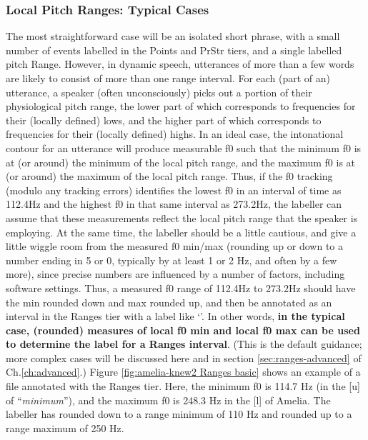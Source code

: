 \documentclass[11pt, twoside]{memoir}
\def\textlabel#1{{\relsize{-.5}\fontspec[Mapping=tex-text]{Roboto Mono}{#1}}}
\def\langtext#1{\textit{#1}}
\begin{document}
\subsubsection{Local Pitch Ranges: Typical Cases}\label{sec:local-pitch-ranges-typical-cases}
The most straightforward case will be an isolated short phrase, with a small number of events labelled in the Points and PrStr tiers, and a single labelled pitch Range. However, in dynamic speech, utterances of more than a few words are likely to consist of more than one range interval.
For each (part of an) utterance, a speaker (often unconsciously) picks out a portion of their physiological pitch range, the lower part of which corresponds to frequencies for their (locally defined) lows, and the higher part of which corresponds to frequencies for their (locally defined) highs. In an ideal case, the intonational contour for an utterance will produce measurable f0 such that the minimum f0 is at (or around) the minimum of the local pitch range, and the maximum f0 is at (or around) the maximum of the local pitch range. Thus, if the f0 tracking (modulo any tracking errors) identifies the lowest f0 in an interval of time as 112.4Hz and the highest f0 in that same interval as 273.2Hz, the labeller can assume that these measurements reflect the local pitch range that the speaker is employing.
At the same time, the labeller should be a little cautious, and give a little wiggle room from the measured f0 min\slash max (rounding up or down to a number ending in 5 or 0, typically by at least 1 or 2 Hz, and often by a few more), since precise numbers are influenced by a number of factors, including software settings. Thus, a measured f0 range of 112.4Hz to 273.2Hz should have the min rounded down and max rounded up, and then be annotated as an interval in the Ranges tier with a label like ‘\textlabel{110-280}’. In other words, \textbf{in the typical case, (rounded) measures of local f0 min and local f0 max can be used to determine the label for a Ranges interval}. (This is the default guidance; more complex cases will be discussed here and in section \ref{sec:ranges-advanced} of Ch.\ref{ch:advanced}.)
Figure \ref{fig:amelia-knew2 Ranges basic} shows an example of a file annotated with the Ranges tier. Here, the minimum f0 is 114.7 Hz (in the [u] of “\langtext{minimum}”), and the maximum f0 is 248.3 Hz in the [l] of Amelia. The labeller has rounded down to a range minimum of 110 Hz and rounded up to a range maximum of 250 Hz.
\end{document}
